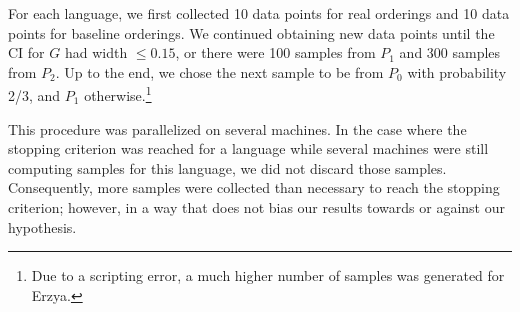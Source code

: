 \documentclass[11pt,letterpaper]{article}
\begin{document}
For each language, we first collected 10 data points for real orderings and 10 data points for baseline orderings.
We continued obtaining new data points until the CI for $G$ had width $\leq 0.15$, or there were 100 samples from $P_1$ and 300 samples from $P_2$.
Up to the end, we chose the next sample to be from $P_0$ with probability 2/3, and $P_1$ otherwise.\footnote{Due to a scripting error, a much higher number of samples was generated for Erzya.}

This procedure was parallelized on several machines.
In the case where the stopping criterion was reached for a language while several machines were still computing samples for this language, we did not discard those samples.
Consequently, more samples were collected than necessary to reach the stopping criterion; however, in a way that does not bias our results towards or against our hypothesis.



\end{document}
